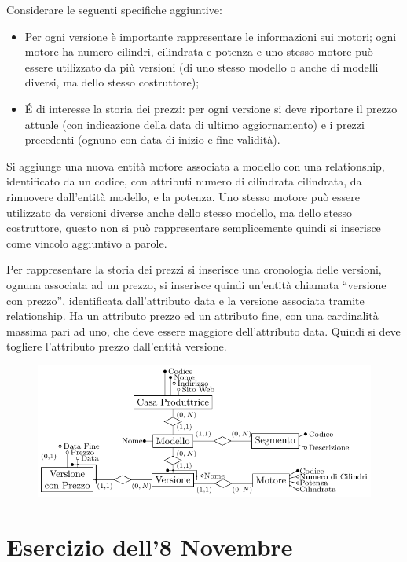 \documentclass{article}
\numberwithin{equation}{subsection}
\begin{document}
Considerare le seguenti specifiche aggiuntive:
\begin{itemize}
    \item Per ogni versione è importante rappresentare le informazioni sui motori; ogni motore ha numero cilindri, cilindrata e potenza e uno stesso motore può essere 
utilizzato da più versioni (di uno stesso modello o anche di modelli diversi, ma dello stesso costruttore);
    \item \'{E} di interesse la storia dei prezzi: per ogni versione si deve riportare il prezzo attuale (con indicazione della data di ultimo aggiornamento) e i 
prezzi precedenti (ognuno con data di inizio e fine validità). 
\end{itemize}

Si aggiunge una nuova entità motore associata a modello con una relationship, identificato da un codice, con attributi numero di cilindrata cilindrata, da 
rimuovere dall'entità modello, e la potenza. Uno stesso motore può essere utilizzato da versioni diverse anche dello stesso modello, ma dello stesso costruttore, 
questo non si può rappresentare semplicemente quindi si inserisce come vincolo aggiuntivo a parole. 


Per rappresentare la storia dei prezzi si inserisce una cronologia delle versioni, ognuna associata ad un prezzo, si inserisce quindi un'entità 
chiamata ``versione con prezzo'', identificata dall'attributo data e la versione associata tramite relationship. Ha un attributo prezzo ed un 
attributo fine, con una cardinalità massima pari ad uno, che deve essere maggiore dell'attributo data. Quindi si deve togliere l'attributo prezzo 
dall'entità versione. 

\begin{figure}[H]%
    \centering%
    \includegraphics[scale=1.24]{schema_er_es_2_2.pdf}%
\end{figure}

\clearpage

\section{Esercizio dell'8 Novembre}
\end{document}
